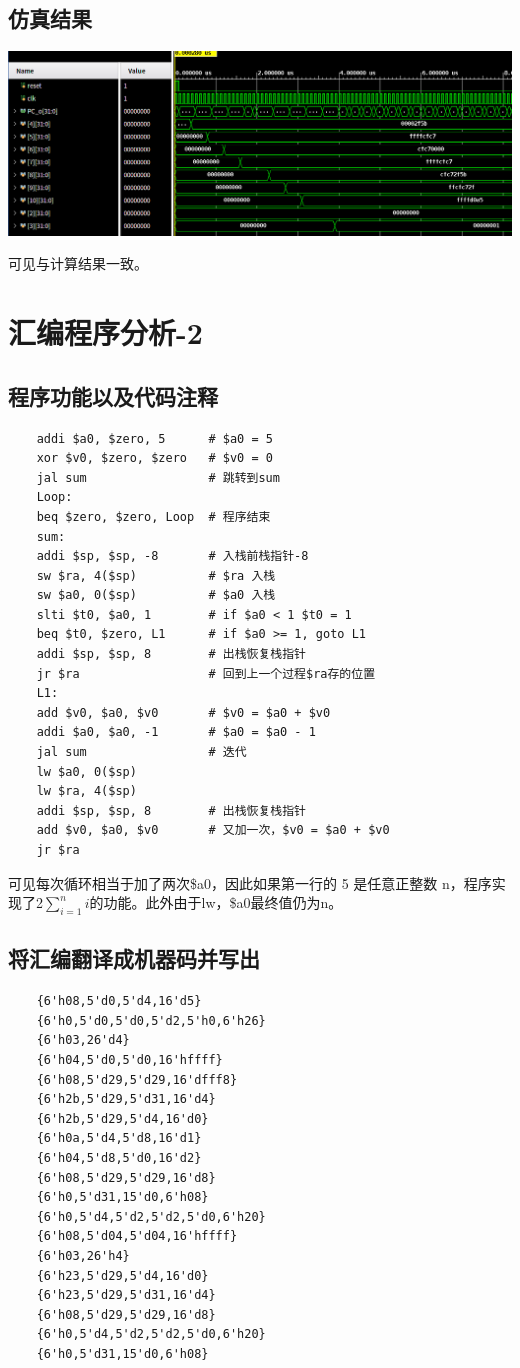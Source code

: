 \documentclass{article}
\begin{document}
\subsection{仿真结果}
\begin{center}
    \includegraphics[width = 14cm]{images/sim_1_waveform.png}
\end{center}
可见与计算结果一致。

\section{汇编程序分析-2}
\subsection{程序功能以及代码注释}
\begin{lstlisting}
    addi $a0, $zero, 5      # $a0 = 5
    xor $v0, $zero, $zero   # $v0 = 0
    jal sum                 # 跳转到sum
    Loop:
    beq $zero, $zero, Loop  # 程序结束
    sum:
    addi $sp, $sp, -8       # 入栈前栈指针-8
    sw $ra, 4($sp)          # $ra 入栈
    sw $a0, 0($sp)          # $a0 入栈
    slti $t0, $a0, 1        # if $a0 < 1 $t0 = 1
    beq $t0, $zero, L1      # if $a0 >= 1, goto L1
    addi $sp, $sp, 8        # 出栈恢复栈指针
    jr $ra                  # 回到上一个过程$ra存的位置
    L1:
    add $v0, $a0, $v0       # $v0 = $a0 + $v0
    addi $a0, $a0, -1       # $a0 = $a0 - 1
    jal sum                 # 迭代
    lw $a0, 0($sp)          
    lw $ra, 4($sp)
    addi $sp, $sp, 8        # 出栈恢复栈指针
    add $v0, $a0, $v0       # 又加一次，$v0 = $a0 + $v0
    jr $ra
\end{lstlisting}
可见每次循环相当于加了两次\$a0，因此如果第一行的 5 是任意正整数 n，程序实现了2$\sum_{i=1}^ni$的功能。此外由于lw，\$a0最终值仍为n。
\subsection{将汇编翻译成机器码并写出}
\begin{lstlisting}
    {6'h08,5'd0,5'd4,16'd5}
    {6'h0,5'd0,5'd0,5'd2,5'h0,6'h26}
    {6'h03,26'd4}
    {6'h04,5'd0,5'd0,16'hffff}
    {6'h08,5'd29,5'd29,16'dfff8}
    {6'h2b,5'd29,5'd31,16'd4}
    {6'h2b,5'd29,5'd4,16'd0}
    {6'h0a,5'd4,5'd8,16'd1}
    {6'h04,5'd8,5'd0,16'd2}
    {6'h08,5'd29,5'd29,16'd8}
    {6'h0,5'd31,15'd0,6'h08}
    {6'h0,5'd4,5'd2,5'd2,5'd0,6'h20}
    {6'h08,5'd04,5'd04,16'hffff}
    {6'h03,26'h4}
    {6'h23,5'd29,5'd4,16'd0}
    {6'h23,5'd29,5'd31,16'd4}
    {6'h08,5'd29,5'd29,16'd8}
    {6'h0,5'd4,5'd2,5'd2,5'd0,6'h20}
    {6'h0,5'd31,15'd0,6'h08}
\end{lstlisting}
\end{document}
